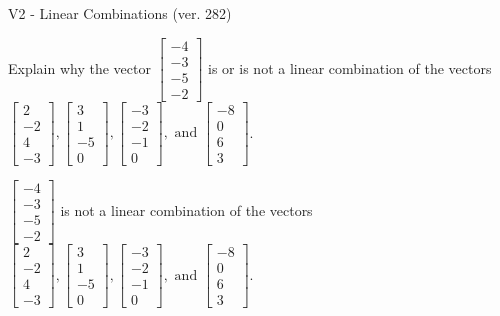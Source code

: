 \begin{exercise}
  \begin{exerciseTitle}V2 - Linear Combinations (ver. 282)\end{exerciseTitle}
  \begin{exerciseStatement}
    Explain why the vector \(\left[\begin{array}{c}
-4 \\
-3 \\
-5 \\
-2
\end{array}\right]\)  is or is not a linear 
	combination of the vectors \(\left[\begin{array}{c}
2 \\
-2 \\
4 \\
-3
\end{array}\right] , \left[\begin{array}{c}
3 \\
1 \\
-5 \\
0
\end{array}\right] , \left[\begin{array}{c}
-3 \\
-2 \\
-1 \\
0
\end{array}\right] , \text{ and } \left[\begin{array}{c}
-8 \\
0 \\
6 \\
3
\end{array}\right]\).
	


  \end{exerciseStatement}
  \begin{exerciseAnswer}
   \(\left[\begin{array}{c}
-4 \\
-3 \\
-5 \\
-2
\end{array}\right]\) 
  	 is not  
	a linear combination of the vectors \(\left[\begin{array}{c}
2 \\
-2 \\
4 \\
-3
\end{array}\right] , \left[\begin{array}{c}
3 \\
1 \\
-5 \\
0
\end{array}\right] , \left[\begin{array}{c}
-3 \\
-2 \\
-1 \\
0
\end{array}\right] , \text{ and } \left[\begin{array}{c}
-8 \\
0 \\
6 \\
3
\end{array}\right]\).


\end{exerciseAnswer}
\end{exercise}
